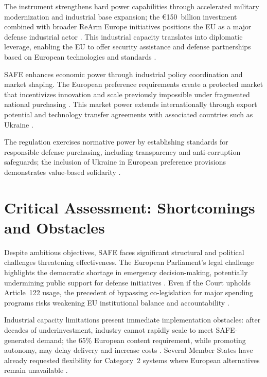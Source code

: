 \documentclass[12pt,a4paper]{article}
\begin{document}
\noindent The instrument strengthens hard power capabilities through accelerated military modernization and industrial base expansion; the €150~billion investment combined with broader ReArm Europe initiatives positions the EU as a major defense industrial actor \parencite{council2025safe,euronews2025}. This industrial capacity translates into diplomatic leverage, enabling the EU to offer security assistance and defense partnerships based on European technologies and standards \parencite{council2025safe}.

\noindent SAFE enhances economic power through industrial policy coordination and market shaping. The European preference requirements create a protected market that incentivizes innovation and scale previously impossible under fragmented national purchasing \parencite{commission2025proposal}. This market power extends internationally through export potential and technology transfer agreements with associated countries such as Ukraine \parencite{commission2025proposal,euronews2025}.

\noindent The regulation exercises normative power by establishing standards for responsible defense purchasing, including transparency and anti-corruption safeguards; the inclusion of Ukraine in European preference provisions demonstrates value-based solidarity \parencite{euronews2025}.

\section*{Critical Assessment: Shortcomings and Obstacles}
\noindent Despite ambitious objectives, SAFE faces significant structural and political challenges threatening effectiveness. The European Parliament's legal challenge highlights the democratic shortage in emergency decision-making, potentially undermining public support for defense initiatives \parencite{eunews2025parliament,verfassungsblog2025}. Even if the Court upholds Article~122 usage, the precedent of bypassing co-legislation for major spending programs risks weakening EU institutional balance and accountability \parencite{verfassungsblog2025}.

\noindent Industrial capacity limitations present immediate implementation obstacles: after decades of underinvestment, industry cannot rapidly scale to meet SAFE-generated demand; the 65\% European content requirement, while promoting autonomy, may delay delivery and increase costs \parencite{commission2025update,commission2025proposal}. Several Member States have already requested flexibility for Category~2 systems where European alternatives remain unavailable \parencite{commission2025update}.
\end{document}
